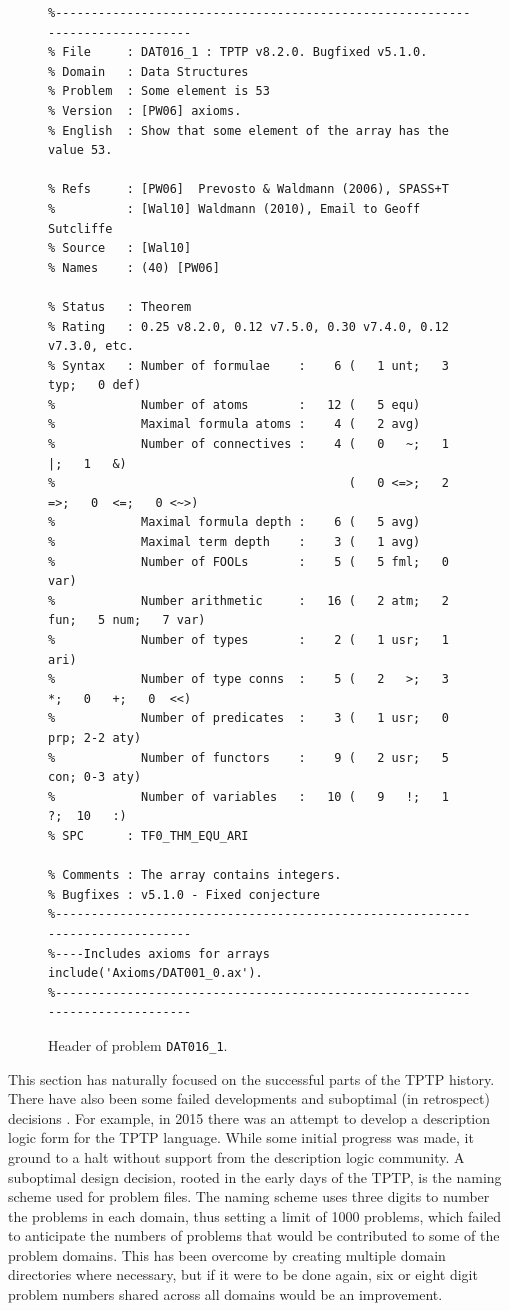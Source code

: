 \documentclass{easychair}
\begin{document}
\begin{figure}[htb]
{\footnotesize
{\setlength{\baselineskip}{3mm}
\begin{verbatim}
%------------------------------------------------------------------------------
% File     : DAT016_1 : TPTP v8.2.0. Bugfixed v5.1.0.
% Domain   : Data Structures
% Problem  : Some element is 53
% Version  : [PW06] axioms.
% English  : Show that some element of the array has the value 53.

% Refs     : [PW06]  Prevosto & Waldmann (2006), SPASS+T
%          : [Wal10] Waldmann (2010), Email to Geoff Sutcliffe
% Source   : [Wal10]
% Names    : (40) [PW06]

% Status   : Theorem
% Rating   : 0.25 v8.2.0, 0.12 v7.5.0, 0.30 v7.4.0, 0.12 v7.3.0, etc.
% Syntax   : Number of formulae    :    6 (   1 unt;   3 typ;   0 def)
%            Number of atoms       :   12 (   5 equ)
%            Maximal formula atoms :    4 (   2 avg)
%            Number of connectives :    4 (   0   ~;   1   |;   1   &)
%                                         (   0 <=>;   2  =>;   0  <=;   0 <~>)
%            Maximal formula depth :    6 (   5 avg)
%            Maximal term depth    :    3 (   1 avg)
%            Number of FOOLs       :    5 (   5 fml;   0 var)
%            Number arithmetic     :   16 (   2 atm;   2 fun;   5 num;   7 var)
%            Number of types       :    2 (   1 usr;   1 ari)
%            Number of type conns  :    5 (   2   >;   3   *;   0   +;   0  <<)
%            Number of predicates  :    3 (   1 usr;   0 prp; 2-2 aty)
%            Number of functors    :    9 (   2 usr;   5 con; 0-3 aty)
%            Number of variables   :   10 (   9   !;   1   ?;  10   :)
% SPC      : TF0_THM_EQU_ARI

% Comments : The array contains integers.
% Bugfixes : v5.1.0 - Fixed conjecture
%------------------------------------------------------------------------------
%----Includes axioms for arrays
include('Axioms/DAT001_0.ax').
%------------------------------------------------------------------------------
\end{verbatim}
}}
\caption{Header of problem {\tt DAT016\_1}.}
\label{ExampleHeader}
\end{figure}


This section has naturally focused on the successful parts of the TPTP history.
There have also been some failed developments and suboptimal (in retrospect) decisions \frownie{}.
For example, in 2015 there was an attempt to develop a description logic form for the TPTP 
language. 
While some initial progress was made, it ground to a halt without support from the description 
logic community.
A suboptimal design decision, rooted in the early days of the TPTP, is the naming scheme used for 
problem files. 
The naming scheme uses three digits to number the problems in each domain, thus setting a limit 
of 1000 problems, which failed to anticipate the numbers of problems that would be contributed 
to some of the problem domains.
This has been overcome by creating multiple domain directories where necessary, but if it were 
to be done again, six or eight digit problem numbers shared across all domains would be an 
improvement.
\end{document}
